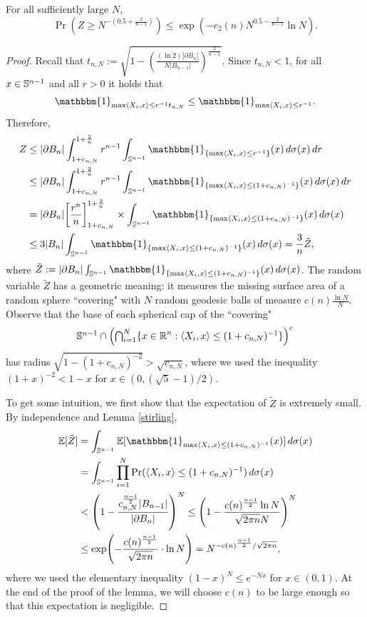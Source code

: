 \begin{lemma}\label{Zprop}
	For all sufficiently large $N$,
	\[\Pr\left(Z \geq N^{-(0.5+\frac{2}{n-1})}\right) \leq \exp\left(-c_2(n)N^{0.5-\frac{2}{n-1}}\ln N\right).\]
\end{lemma}
\begin{proof}%
	Recall that $t_{n,N}:=\sqrt{1-\left(\frac{(\ln 2)|\partial B_n|}{N|B_{n-1}|}\right)^{\frac{2}{n-1}}}$. Since $t_{n,N}<1$,  for all $x\in\mathbb{S}^{n-1}$ and all $r> 0$ it holds that 
	\[
	\mathbbm{1}_{\max\langle X_i,x\rangle \leq r^{-1}t_{n,N}} \leq \mathbbm{1}_{\max\langle X_i,x\rangle \leq r^{-1}}.
	\]
	Therefore, 
	\begin{align*} Z &\leq |\partial B_n|\int_{1+c_{n,N}}^{1+\frac{2}{n}}r^{n-1}\int_{\mathbb{S}^{n-1}}\mathbbm{1}_{\{\max\langle X_{i},x\rangle\leq r^{-1}\}}(x)\,d\sigma(x)\,dr\\
	& \leq|\partial B_n|\int_{1+c_{n,N}}^{1+\frac{2}{n}}r^{n-1}\int_{\mathbb{S}^{n-1}}\mathbbm{1}_{\{\max\langle X_{i},x\rangle\leq(1+c_{n,N})^{-1}\}}(x)\,d\sigma(x)\,dr\\
	& =|\partial B_n|\left[\frac{r^{n}}{n}\right]_{1+c_{n,N}}^{1+\frac{2}{n}}\times\int_{\Sp}\mathbbm{1}_{\{\max\langle X_{i},x\rangle\leq(1+c_{n,N})^{-1}\}}(x)\,d\sigma(x)\\
	& \leq3|B_n|\int_{\Sp}\mathbbm{1}_{\{\max\langle X_{i},x\rangle\leq(1+c_{n,N})^{-1}\}}(x)\,d\sigma(x)=\frac{3}{n}\tilde{Z},
	\end{align*}
	where $\tilde Z:=|\partial B_n|\int_{\mathbb{S}^{n-1}}\mathbbm{1}_{\{\max\langle X_{i},x\rangle\leq(1+c_{n,N})^{-1}\}}(x)\,d\sigma(x)$. %
	The random variable $ \tilde Z $ has a geometric meaning: it measures the missing surface area of a random sphere ``covering" with $ N $ random geodesic balls of measure $ c(n)\frac{\ln N}{N}$. Observe that the base of each spherical  cap of the ``covering" 
	\[
	\textstyle \Sp \cap \left(\bigcap_{i=1}^N \{x\in\R^n: \langle X_i,x\rangle \leq (1+c_{n,N})^{-1}\}\right)^c
	\]
	has radius $\sqrt{1-(1+c_{n,N})^{-2}}>  \sqrt{c_{n,N}}$, where we used the inequality $(1+x)^{-2} < 1-x$ for $x\in(0, (\sqrt{5}-1)/2)$. 
	
	To get some intuition, we first show that the expectation of $ \tilde Z $ is extremely small. By  independence and Lemma \ref{stirling},%
	\begin{align*}
	\E[\tilde Z] &=\int_{\Sp} \E[\mathbbm{1}_{\max\langle X_i,x\rangle \leq (1+c_{n,N})^{-1}}(x)]\,d\sigma(x)\\
	&=\int_{\Sp} \prod_{i=1}^N\Pr(\langle X_i,x\rangle \leq (1+c_{n,N})^{-1})\,d\sigma(x)\\
	&<\left(1-\frac{c_{n,N}^{\frac{n-1}{2}}|B_{n-1}|}{|\partial B_n|}\right)^N
	\leq \left(1-\frac{c(n)^{\frac{n-1}{2}}\ln N}{\sqrt{2\pi n}N}\right)^N\\
	&\leq \exp\left(-\frac{c(n)^{\frac{n-1}{2}}}{\sqrt{2\pi n}}\cdot\ln N\right)=N^{-c(n)^{\frac{n-1}{2}}/\sqrt{2\pi n}},
	\end{align*}where  we used the elementary inequality $(1-x)^N \leq e^{-Nx}$ for $x\in(0,1)$. 
	At the end of the proof of the lemma, we will choose $ c(n) $ to be large enough so that this expectation is negligible.
	

\end{proof}

